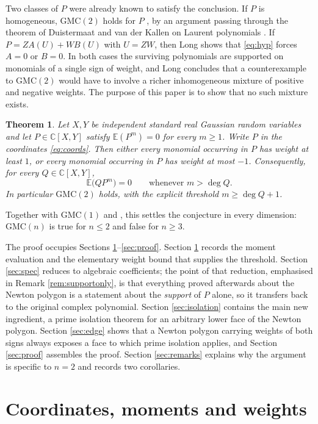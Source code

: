 \documentclass[10pt,a4paper]{amsart}
\newtheorem{theorem}{Theorem}
\numberwithin{equation}{section}
\newcommand{\C}{\mathbb{C}}
\newcommand{\E}{\mathbb{E}}
\newcommand{\GMC}{\mathrm{GMC}}
\begin{document}
Two classes of $P$ were already known to satisfy the conclusion. If $P$ is
homogeneous, $\GMC(2)$ holds for $P$ \cite[Cor.~4.4]{DvdEZ}, by an argument
passing through the theorem of Duistermaat and van der Kallen on Laurent
polynomials \cite{DvdK}. If $P=ZA(U)+WB(U)$ with $U=ZW$, then Long
\cite[\S7]{Long} shows that \eqref{eq:hyp} forces $A=0$ or $B=0$. In both cases
the surviving polynomials are supported on monomials of a single sign of weight,
and Long concludes that a counterexample to $\GMC(2)$ would have to involve a
richer inhomogeneous mixture of positive and negative weights. The purpose of
this paper is to show that no such mixture exists.

\begin{theorem}\label{thm:main}
Let $X,Y$ be independent standard real Gaussian random variables and let
$P\in\C[X,Y]$ satisfy $\E(P^m)=0$ for every $m\ge1$. Write $P$ in the
coordinates \eqref{eq:coords}. Then either every monomial occurring in $P$ has
weight at least $1$, or every monomial occurring in $P$ has weight at most
$-1$. Consequently, for every $Q\in\C[X,Y]$,
\[
  \E\bigl(QP^m\bigr)=0 \qquad\text{whenever } m>\deg Q .
\]
In particular $\GMC(2)$ holds, with the explicit threshold $m\ge\deg Q+1$.
\end{theorem}

Together with $\GMC(1)$ \cite[Prop.~4.2]{DvdEZ} and \cite{Long}, this settles
the conjecture in every dimension: $\GMC(n)$ is true for $n\le2$ and false for
$n\ge3$.

The proof occupies Sections \ref{sec:prelim}--\ref{sec:proof}. Section
\ref{sec:prelim} records the moment evaluation and the elementary weight bound
that supplies the threshold. Section \ref{sec:spec} reduces to algebraic
coefficients; the point of that reduction, emphasised in Remark
\ref{rem:supportonly}, is that everything proved afterwards about the Newton
polygon is a statement about the \emph{support} of $P$ alone, so it transfers
back to the original complex polynomial. Section \ref{sec:isolation} contains
the main new ingredient, a prime isolation theorem for an arbitrary lower face
of the Newton polygon. Section \ref{sec:edge} shows that a Newton polygon
carrying weights of both signs always exposes a face to which prime isolation
applies, and Section \ref{sec:proof} assembles the proof. Section
\ref{sec:remarks} explains why the argument is specific to $n=2$ and records two
corollaries.

\section{Coordinates, moments and weights}\label{sec:prelim}
\end{document}
